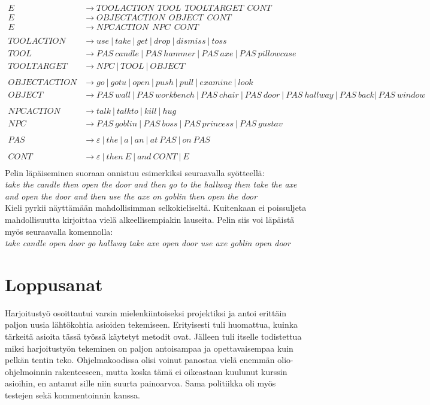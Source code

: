 \documentclass[a4paper,12pt,finnish]{article}
\begin{document}
  \begin{align*}
    E &\to TOOLACTION \ \ TOOL \ \ TOOLTARGET \ \  CONT \\
    E &\to OBJECTACTION \ \ OBJECT \ \    CONT \\
    E &\to NPCACTION \ \ NPC \ \ CONT \\ 
\\
    TOOLACTION &\to use \ | \ take \ |\ get \ | \ drop \ | \ dismiss \ | \ toss\\
    TOOL &\to PAS  \ candle \ | \ PAS \ hammer \ | \ PAS \  axe \ | \ PAS \  pillowcase\\
   TOOLTARGET &\to NPC \ | \ TOOL \ | \ OBJECT \\
\\
OBJECTACTION &\to go \ | \ gotu \ |\ open \ | \ push \ | \ pull \ | \ examine \ | \ look\\
OBJECT &\to  PAS \ wall  \ |\ PAS \ workbench \ | \  PAS \ chair \ | \  PAS \ door \ | \  PAS \ hallway \ | \  PAS \ back | \  PAS \ window  \\
\\
NPCACTION &\to talk \ | \ talkto \ | \ kill \ | \ hug \\
NPC &\to PAS \ goblin \ | \ PAS \ boss \ | \ PAS \ princess \ | \ PAS \ gustav \\
\\
PAS &\to\varepsilon \ | \ the \ | \ a \ | \ an \ | \ at \ PAS \ | \ on \ PAS \\
\\
CONT &\to\varepsilon \ | \ then \ E \ | \ and \ CONT \ | \ E  \\
\end{align*}
Pelin läpäiseminen suoraan onnistuu esimerkiksi seuraavalla syötteellä: \\
\newline
\textit{ take the candle then open the door and then go to the hallway then take the axe and open the door and then use the axe on goblin then open the door} \\
\newline
Kieli pyrkii näyttämään mahdollisimman selkokieliseltä. Kuitenkaan ei poissuljeta mahdollisuutta kirjoittaa vielä alkeellisempiakin lauseita. Pelin siis voi läpäistä myös seuraavalla komennolla: \\ \newline
\textit{take candle open door go  hallway take axe open door use axe goblin open door}

\section {Loppusanat}
Harjoitustyö osoittautui varsin mielenkiintoiseksi projektiksi ja antoi erittäin paljon uusia lähtökohtia asioiden tekemiseen. Erityisesti tuli huomattua, kuinka tärkeitä asioita tässä työssä käytetyt metodit ovat. Jälleen tuli itselle todistettua miksi harjoitustyön tekeminen on paljon antoisampaa ja opettavaisempaa kuin pelkän tentin teko. Ohjelmakoodissa olisi voinut panostaa vielä enemmän olio-ohjelmoinnin rakenteeseen, mutta koska tämä ei oikeastaan kuulunut kurssin asioihin, en antanut sille niin suurta painoarvoa. Sama politiikka oli myös testejen sekä kommentoinnin kanssa.
\end{document}
